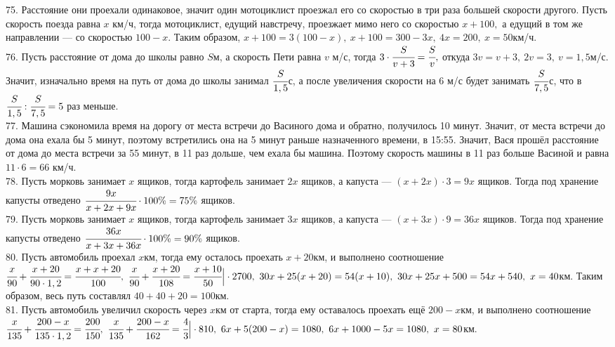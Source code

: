 75. Расстояние они проехали одинаковое, значит один мотоциклист проезжал его со скоростью в три раза большей скорости другого. Пусть скорость поезда равна $x$ км/ч, тогда мотоциклист, едущий навстречу, проезжает мимо него со скоростью $x+100,$ а едущий в том же направлении --- со скоростью $100-x.$ Таким образом, $x+100=3(100-x),\ x+100=300-3x,\ 4x=200,\ x=50$км/ч.\\
76. Пусть расстояние от дома до школы равно $S$м, а скорость Пети равна $v$ м/с, тогда $3\cdot\cfrac{S}{v+3}=\cfrac{S}{v},$ откуда $3v=v+3,\ 2v=3,\ v=1,5$м/с. Значит, изначально время на путь от дома до школы занимал $\cfrac{S}{1,5}$с, а после увеличения скорости на 6 м/с будет занимать $\cfrac{S}{7,5}$с, что в $\cfrac{S}{1,5}:\cfrac{S}{7,5}=5$ раз меньше.\\
77. Машина сэкономила время на дорогу от места встречи до Васиного дома и обратно, получилось 10 минут. Значит, от места встречи до дома она ехала бы 5 минут, поэтому встретились она на 5 минут раньше назначенного времени, в 15:55. Значит, Вася прошёл расстояние от дома до места встречи за 55 минут, в 11 раз дольше, чем ехала бы машина. Поэтому скорость машины в 11 раз больше Васиной и равна $11\cdot6=66$ км/ч.\\
78. Пусть морковь занимает $x$ ящиков, тогда картофель занимает $2x$ ящиков, а капуста --- $(x+2x)\cdot3=9x$ ящиков. Тогда под хранение капусты отведено $\cfrac{9x}{x+2x+9x}\cdot100\%=75\%$ ящиков.\\
79. Пусть морковь занимает $x$ ящиков, тогда картофель занимает $3x$ ящиков, а капуста --- $(x+3x)\cdot9=36x$ ящиков. Тогда под хранение капусты отведено $\cfrac{36x}{x+3x+36x}\cdot100\%=90\%$ ящиков.\\
80. Пусть автомобиль проехал $x$км, тогда ему осталось проехать $x+20$км, и выполнено соотношение $\cfrac{x}{90}+\cfrac{x+20}{90\cdot1,2}=\cfrac{x+x+20}{100},\
\cfrac{x}{90}+\cfrac{x+20}{108}=\cfrac{x+10}{50}\Big|\cdot2700,\
30x+25(x+20)=54(x+10),\ 30x+25x+500=54x+540,\ x=40$км. Таким образом, весь путь составлял $40+40+20=100$км.\\
81. Пусть автомобиль увеличил скорость через $x$км от старта, тогда ему оставалось проехать ещё $200-x$км, и выполнено соотношение
$\cfrac{x}{135}+\cfrac{200-x}{135\cdot1,2}=\cfrac{200}{150},\
\cfrac{x}{135}+\cfrac{200-x}{162}=\cfrac{4}{3}\Big|\cdot 810,\
6x+5(200-x)=1080,\ 6x+1000-5x=1080,\ x=80$км.
\newpage
